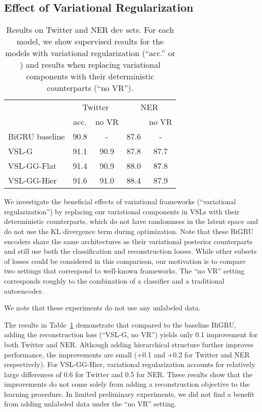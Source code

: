 \documentclass[11pt,a4paper]{article}
\newcommand{\vsmg}{VSL-G\xspace}
\newcommand{\vsmggflat}{VSL-GG-Flat\xspace}
\newcommand{\vsmgghier}{VSL-GG-Hier\xspace}
\begin{document}
\subsection{Effect of Variational Regularization}
\begin{table}[t]
\setlength{\tabcolsep}{4pt}
\centering
\begin{tabular}{l|c|c|c|c}
        & \multicolumn{2}{c|}{Twitter} & \multicolumn{2}{c}{NER} \\
        & \multicolumn{1}{c}{acc.} & no VR & \multicolumn{1}{c}{} & no VR \\
\hline
BiGRU baseline     & 90.8  &   -  & 87.6 & -   \\
\vsmg              & 91.1  & 90.9 & 87.8 & 87.7 \\
\vsmggflat         & 91.4  & 90.9 & 88.0 & 87.8 \\
\vsmgghier         & 91.6  & 91.0 & 88.4 & 87.9 \\
\end{tabular}
\caption{Results on Twitter and NER dev sets. For each model, we show supervised results for the models with variational regularization (``acc.'' or ) and results when replacing variational components with their deterministic counterparts (``no VR'').}
\label{vr-reg}
\end{table}

We investigate the beneficial effects of variational frameworks (``variational regularization'') by replacing our variational components in VSLs with their deterministic counterparts, which do not have randomness in the latent space and do not use the KL divergence term during optimization.
Note that these BiGRU encoders share the same architectures as their variational posterior counterparts and still use both the classification and
reconstruction losses.
While other subsets of losses could be considered in this comparison, our motivation is to compare two settings that correspond to well-known frameworks. The ``no VR'' setting corresponds roughly to the combination of a classifier and a traditional autoencoder.

We note that these experiments do not use any unlabeled data.

The results in Table~\ref{vr-reg} demonstrate that compared to the baseline BiGRU, adding the reconstruction loss (``\vsmg, no VR'') yields only 0.1 improvement for both Twitter and NER. Although adding hierarchical structure further improves performance, the improvements are small (+0.1 and +0.2 for Twitter and NER respectively).
For \vsmgghier, variational regularization accounts for relatively large differences of 0.6 for Twitter and 0.5 for NER. These results show that the improvements do not come solely from adding a reconstruction objective to the learning procedure. In limited preliminary experiments, we did not find a benefit from adding unlabeled data under the ``no VR'' setting.
\end{document}
